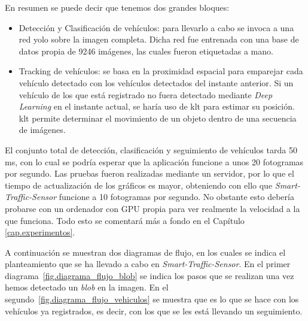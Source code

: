 En resumen se puede decir que tenemos dos grandes bloques:
\begin{itemize}
    \item Detección y Clasificación de vehículos: para llevarlo a cabo se invoca a una red \acrshort{yolo} sobre la imagen completa. Dicha red fue entrenada con una base de datos propia de 9246 imágenes, las cuales fueron etiquetadas a mano.   
    \item Tracking de vehículos: se basa en la proximidad espacial para emparejar cada vehículo detectado con los vehículos detectados del instante anterior. Si un vehículo de los que está registrado no fuera detectado mediante \textit{Deep Learning} en el instante actual, se haría uso de \acrshort{klt} para estimar su posición. \acrshort{klt} permite determinar el movimiento de un objeto dentro de una secuencia de imágenes.
\end{itemize}

El conjunto total de detección, clasificación y seguimiento de vehículos tarda 50 ms, con lo cual se podría esperar que la aplicación funcione a unos 20 fotogramas por segundo. Las pruebas fueron realizadas mediante un servidor, por lo que el tiempo de actualización de los gráficos es mayor, obteniendo con ello que \textit{Smart-Traffic-Sensor} funcione a 10 fotogramas por segundo. No obstante esto debería probarse con un ordenador con GPU propia para ver realmente la velocidad a la que funciona. Todo esto se comentará más a fondo en el Capítulo \ref{cap.experimentos}.

A continuación se muestran dos diagramas de flujo, en los cuales se indica el planteamiento que se ha llevado a cabo en \textit{Smart-Traffic-Sensor}. En el primer diagrama~\ref{fig.diagrama_flujo_blob} se indica los pasos que se realizan una vez hemos detectado un \textit{blob} en la imagen. En el segundo~\ref{fig.diagrama_flujo_vehiculos} se muestra que es lo que se hace con los vehículos ya registrados, es decir, con los que se les está llevando un seguimiento.

